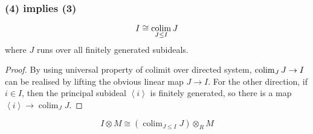 \documentclass[aspectratio=169]{beamer}
\begin{document}
\begin{frame}[fragile]
\frametitle{(4) implies (3)}
\begin{minipage}{0.1\textwidth}
\end{minipage}%
\begin{minipage}{0.9\textwidth}
\begin{lemma}
  \[I \cong \operatornamewithlimits{colim}_{J\le I} J\]
  where $J$ runs over all finitely generated subideals.
\end{lemma}
\begin{proof}
By using universal property of colimit over directed system,
$\operatornamewithlimits{colim}_{J} J \to I$ can be realised by lifting
the obvious linear map $J \to I$.
For the other direction, if $i \in I$, then the principal subideal 
$\left\langle i\right\rangle$ is finitely generated, so there is a
map $\left\langle i\right\rangle\to \operatorname{colim}_{J} J$.
\end{proof}

\begin{corollary}
  \[
    I \otimes M \cong \left(\operatorname{colim}_{J \le I} J\right) \otimes_R M
  \]
\end{corollary}

\end{minipage}%

\end{frame}
\end{document}
